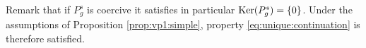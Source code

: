 \documentclass[10pt]{amsart}
\numberwithin{equation}{section}
\def\ker{{\mathop{\rm Ker}}}
\theoremstyle{plain}
\theoremstyle{remark}
\begin{document}

Remark that if $P_g^s$ is coercive it satisfies in particular $\ker(P_g^s) = \{0\}$. Under the assumptions of Proposition \ref{prop:vp1:simple}, property \eqref{eq:unique:continuation} is therefore satisfied. 
\end{document}
